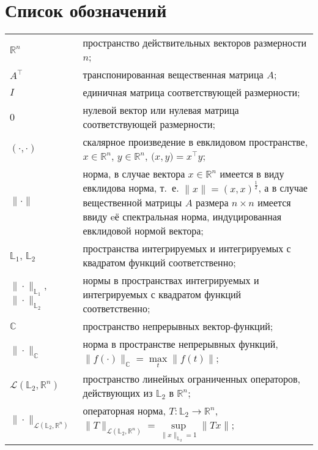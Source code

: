 \documentclass[../main.tex]{subfiles}
\begin{document}
\clearpage
\section*{Список обозначений}
\begin{tabularx}{\textwidth}{lY}
 $\mathbb{R}^n$ & пространство действительных векторов размерности $n$; \\ 
 
 $A^{\top}$ & транспонированная вещественная матрица $A$; \\ 
 
 $I$ & единичная матрица соответствующей размерности; \\ 
 
 $0$ & нулевой вектор или нулевая матрица соответствующей размерности; \\
 
 $(\cdot,\cdot)$ & скалярное произведение в евклидовом пространстве, $x \in \mathbb{R}^n$, $y \in \mathbb{R}^n$, $ \Big(x, y\Big) = x^{\top} y$; \\
 
 $\| \cdot\| $ & норма, в случае вектора $x \in \mathbb{R}^n$ имеется в виду евклидова норма, т.~е. $\|x\| = (x,x)^{\frac{1}{2}}$, а в случае вещественной матрицы $A$ размера $n \times n$ имеется ввиду eё спектральная норма, индуцированная евклидовой нормой вектора; \\
 
 $\mathbb{L}_1$, $\mathbb{L}_2$ & пространства интегрируемых и интегрируемых с квадратом функций соответственно; \\
 
 $\|\cdot\|_{\mathbb{L}_1}$, $\|\cdot\|_{\mathbb{L}_2}$ & нормы в пространствах интегрируемых и интегрируемых с квадратом функций соответственно; \\
 
 $ \mathbb{C} $ & пространство непрерывных вектор-функций; \\
 
 $\|\cdot\|_\mathbb{C}$ & норма в пространстве непрерывных функций, $\|f(\cdot) \|_\mathbb{C} = \max\limits_{t} \|f(t)\|$; \\
 
 $\mathcal{L}(\mathbb{L}_2, \mathbb{R}^n)$ & пространство линейных ограниченных операторов, действующих из $\mathbb{L}_2$ в $\mathbb{R}^n$; \\ 
 
 $\| \cdot \|_{\mathcal{L}(\mathbb{L}_2, \mathbb{R}^n)}$ & операторная норма, $T: \mathbb{L}_2 \to \mathbb{R}^n $, $\| T \|_{\mathcal{L}(\mathbb{L}_2, \mathbb{R}^n)} = \sup\limits_{\|x\|_{\mathbb{L}_2} = 1} \| T x \| $;\\
 

\end{tabularx}
\end{document}
